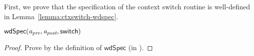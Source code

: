 First, we prove that the specification of
the context switch routine is well-defined in
Lemma~\ref{lemma:ctxswitch-wdspec}.
\begin{lemma}
    \em
    \label{lemma:ctxswitch-wdspec}
    $\textsf{wdSpec}({\textit{a}_\textit{pre}}, {\textit{a}_\textit{post}}, {\mathsf{switch}})$
\end{lemma}
\begin{proof}
    Prove by the definition of $\textsf{wdSpec}$ 
    (in \Def{\ref{def:well-defined specification}}).
\end{proof}


